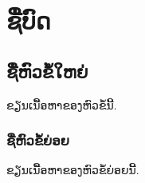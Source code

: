 \chapter{ຊື່ບົດ}

\section{ຊື່ຫົວຂໍ້ໃຫຍ່}
ຂຽນເນື້ອຫາຂອງຫົວຂໍ້ນີ້.

\subsection{ຊື່ຫົວຂໍ້ຍ່ອຍ}
ຂຽນເນື້ອຫາຂອງຫົວຂໍ້ຍ່ອຍນີ້.
